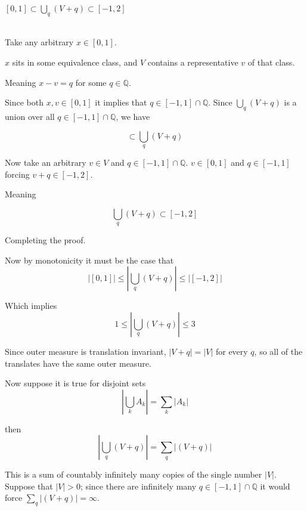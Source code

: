 \documentclass[12pt]{article}
\makeatletter
\theoremstyle{plain}
\theoremstyle{definition}
\theoremstyle{definition}
\theoremstyle{remark}
\renewenvironment{proof}[1][\proofname]{\par
\pushQED{\qed}\normalfont\topsep6\p@\@plus6\p@\relax
\trivlist\item[\hskip\labelsep\small\itshape #1\@addpunct{.}]\ignorespaces\mbox{}\\
}{\popQED\endtrivlist\@endpefalse}
\makeatother
\begin{document}
\begin{lemma}
    $[0, 1] \subset \bigcup_q (V + q) \subset [-1, 2]$
\end{lemma}

\begin{proof}[Proof: Vitali Bounded]
Take any arbitrary $x \in [0, 1]$.

$x$ sits in some equivalence class, and $V$ contains a representative $v$ of that class.

Meaning $x - v = q$ for some $q \in \mathbb{Q}$.

Since both $x, v \in [0, 1]$ it implies that $q \in [-1, 1] \cap \mathbb{Q}$.
Since $\bigcup_q (V + q)$ is a union over all $q \in [-1, 1] \cap \mathbb{Q}$, we have

\begin{equation*}
    [0, 1] \subset \bigcup_q (V + q)
\end{equation*}

Now take an arbitrary $v \in V$ and $q \in [-1, 1] \cap \mathbb{Q}$.
$v \in [0, 1]$ and $q \in [-1, 1]$ forcing $v + q \in [-1, 2]$.

Meaning

\begin{equation*}
    \bigcup_q (V + q) \subset [-1, 2]
\end{equation*}

Completing the proof.
\end{proof}

Now by monotonicity it must be the case that
\begin{equation}
    |[0, 1]| \leq |\bigcup_q (V + q)| \leq |[-1, 2]|
\end{equation}

Which implies
\begin{equation}
    1 \leq |\bigcup_q (V + q)| \leq 3
\end{equation}

Since outer measure is translation invariant, $|V + q| = |V|$ for every $q$, so all of the
translates have the same outer measure.

Now suppose it is true for disjoint sets
\begin{equation}
    |\bigcup_k A_k| = \sum_k |A_k|
\end{equation}

then
\begin{equation}
    |\bigcup_q (V + q)| = \sum_q |(V + q)|
\end{equation}

This is a sum of countably infinitely many copies of the single number $|V|$.
Suppose that $|V| > 0$; since there are infinitely many $q \in [-1, 1] \cap \mathbb{Q}$ it would force
$\sum_q |(V + q)| = \infty$.
\end{document}
